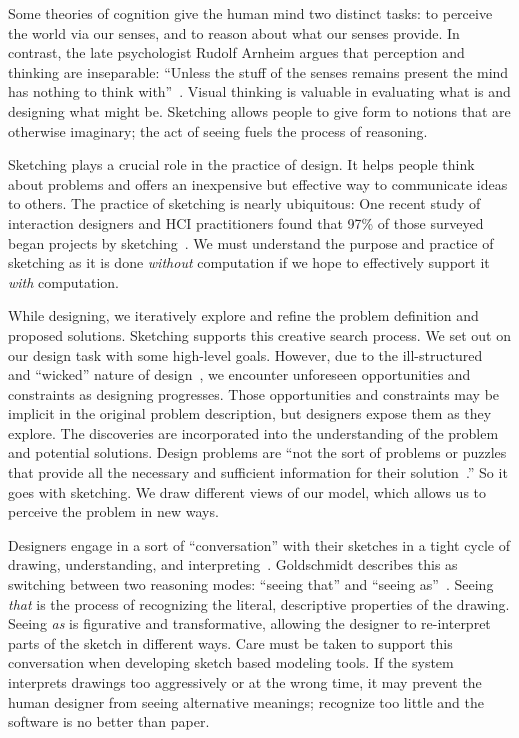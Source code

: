 Some theories of cognition give the human mind two distinct tasks: to
perceive the world via our senses, and to reason about what our senses
provide. In contrast, the late psychologist Rudolf Arnheim argues that
perception and thinking are inseparable: ``Unless the stuff of the
senses remains present the mind has nothing to think
with''~\cite{arnheim-visthink}. Visual thinking is valuable in
evaluating what is and designing what might be. Sketching allows
people to give form to notions that are otherwise imaginary; the act
of seeing fuels the process of reasoning.

Sketching plays a crucial role in the practice of design. It helps
people think about problems and offers an inexpensive but effective
way to communicate ideas to others. The practice of sketching is
nearly ubiquitous: One recent study of interaction designers and HCI
practitioners found that 97\% of those surveyed began projects by
sketching~\cite{myers-behavior-design}. We must understand the purpose
and practice of sketching as it is done \textit{without} computation
if we hope to effectively support it \textit{with} computation.



While designing, we iteratively explore and refine the problem
definition and proposed solutions. Sketching supports this creative
search process. We set out on our design task with some high-level
goals. However, due to the
ill-structured~\cite{simon-ill-structured-problems} and ``wicked''
nature of design~\cite{rittel-wicked}, we encounter unforeseen
opportunities and constraints as designing progresses. Those
opportunities and constraints may be implicit in the original problem
description, but designers expose them as they explore. The
discoveries are incorporated into the understanding of the problem and
potential solutions. Design problems are ``not the sort of problems or
puzzles that provide all the necessary and sufficient information for
their solution~\cite{cross-nature-nurture}.'' So it goes with
sketching. We draw different views of our model, which allows us to
perceive the problem in new ways.

Designers engage in a sort of ``conversation'' with their sketches in
a tight cycle of drawing, understanding, and
interpreting~\cite{schon-kinds-of-seeing}. Goldschmidt describes this
as switching between two reasoning modes: ``seeing that'' and ``seeing
as''~\cite{goldschmidt-dialectics}. Seeing \textit{that} is the
process of recognizing the literal, descriptive properties of the
drawing.  Seeing \textit{as} is figurative and transformative,
allowing the designer to re-interpret parts of the sketch in different
ways. Care must be taken to support this conversation when developing
sketch based modeling tools. If the system interprets drawings too
aggressively or at the wrong time, it may prevent the human designer
from seeing alternative meanings; recognize too little and the
software is no better than paper.

